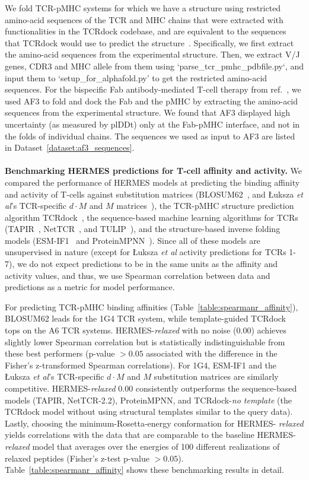 We fold TCR-pMHC systems for which we have a structure using restricted amino-acid sequences of the
TCR and MHC chains that were extracted with functionalities in the TCRdock codebase, and are
equivalent to the sequences that TCRdock would use to predict the structure~\cite{Bradley2023-rl}.
Specifically, we first extract the amino-acid sequences from the experimental structure. Then, we
extract V/J genes, CDR3 and MHC allele from them using `parse\_tcr\_pmhc\_pdbfile.py`, and input
them to `setup\_for\_alphafold.py' to get the restricted amino-acid sequences. For the bispecific
Fab antibody-mediated T-cell therapy from ref.~\cite{Hsiue2021-ag}, we used AF3 to fold and dock the
Fab and the pMHC by extracting the amino-acid sequences from the experimental structure. We found
that AF3 displayed high uncertainty (as measured by plDDt) only at the Fab-pMHC interface, and not
in the folds of individual chains. The sequences we used as input to AF3 are listed in
Dataset~\ref{dataset:af3_sequences}. \\
\\


\noindent \textbf{Benchmarking HERMES predictions for T-cell affinity and activity.} We compared the
performance of HERMES models at predicting the binding affinity and activity of T-cells against
substitution matrices (BLOSUM62~\cite{Henikoff1992-jq}, and \L uksza {\em et al}'s TCR-specific $d
\cdot M$ and $M$ matrices~\cite{Luksza2022-gx}), the TCR-pMHC structure prediction algorithm
TCRdock~\cite{Bradley2023-rl}, the sequence-based machine learning algorithms for TCRs
(TAPIR~\cite{Fast2023-tk}, NetTCR~\cite{Jensen2024-xs}, and TULIP~\cite{Meynard-Piganeau2024-po}),
and the structure-based inverse folding models (ESM-IF1~\cite{Hsu2022-km} and
ProteinMPNN~\cite{Dauparas2022-fu}). Since all of these models are unsupervised in nature (except
for \L uksza {\em et al} activity predictions for TCRs 1-7), we do not expect predictions to be in
the same units as the affinity and activity values, and thus, we use Spearman correlation between
data and predictions as a metric for model performance.

For predicting TCR-pMHC binding affinities (Table~\ref{table:spearmanr_affinity}), 
BLOSUM62 leads for the 1G4 TCR system, while template-guided TCRdock tops on the A6 TCR systems.
HERMES-{\em relaxed} with no noise (0.00) achieves slightly lower Spearman correlation but is
statistically indistinguishable from these best performers (p-value $>0.05$ associated with the
difference in the Fisher's z-transformed Spearman correlations). For 1G4, ESM-IF1 and the \L uksza
{\em et al}'s TCR-specific $d \cdot M$ and $M$ substitution matrices are similarly competitive.
HERMES-{\em relaxed} 0.00 consistently outperforms the sequence-based models (TAPIR, NetTCR-2.2),
ProteinMPNN, and TCRdock-{\em no template} (the TCRdock model without using structural templates
similar to the query data). Lastly, choosing the minimum-Rosetta-energy conformation for HERMES-{\em
relaxed} yields correlations with the data that are comparable to the baseline HERMES-{\em relaxed}
model that averages over the energies of 100 different realizations of relaxed peptides (Fisher's
z-test p-value $>0.05$). Table~\ref{table:spearmanr_affinity} shows these benchmarking results in
detail.


